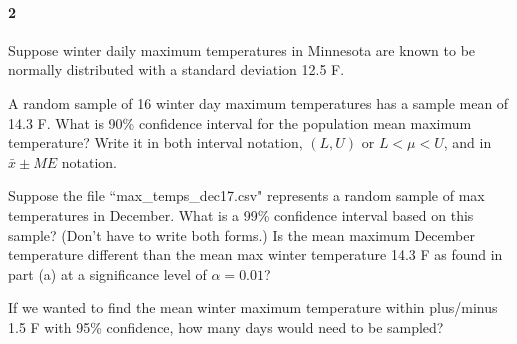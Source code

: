 \documentclass{article}
\begin{document}
\begin{flushleft}
\paragraph{2} Suppose winter daily maximum temperatures in Minnesota are known to be normally distributed with a standard deviation 12.5 \textdegree F. 
\begin{enumalpha}
\item A random sample of 16 winter day maximum temperatures has a sample mean of  14.3 \textdegree F. What is 90\% confidence interval for the population mean maximum temperature? Write it in both interval notation, $(L, U)$ or $L < \mu < U$, and in $\bar x \pm ME$ notation. 
\vspace{2.5in}
\item Suppose the file ``max\_temps\_dec17.csv" represents a random sample of max temperatures in December. What is a 99\% confidence interval based on this sample? (Don't have to write both forms.) Is the mean maximum December temperature different than the mean max winter temperature 14.3 \textdegree F as found in part (a) at a significance level of $\alpha = 0.01$?
\vspace{2.5in}
\item If we wanted to find the mean winter maximum temperature within plus/minus 1.5 \textdegree F with 95\% confidence, how many days would need to be sampled?
\end{enumalpha}



\end{flushleft}
\end{document}
